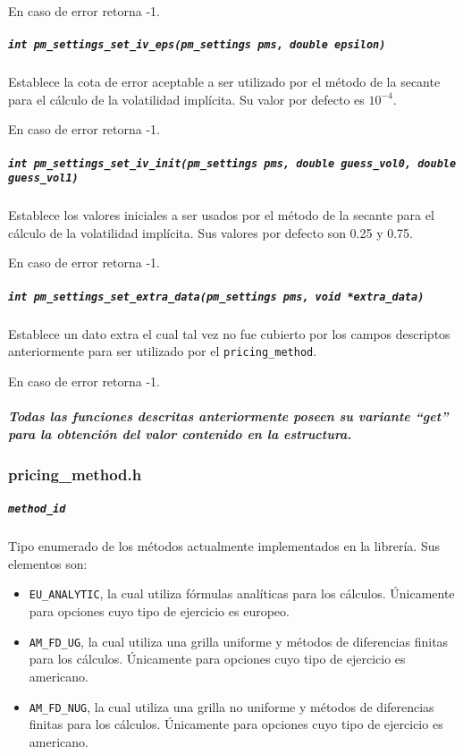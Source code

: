 \documentclass[12pt,a4paper,final]{article}
\begin{document}
				En caso de error retorna -1.

			\subparagraph{\texttt{int pm\_settings\_set\_iv\_eps(pm\_settings pms, double epsilon)}}
				Establece la cota de error aceptable a ser utilizado por el método de la secante
				para el cálculo de la volatilidad implícita. Su valor por defecto es $10^{-4}$.

				En caso de error retorna -1.

			\subparagraph{\texttt{int pm\_settings\_set\_iv\_init(pm\_settings pms, double guess\_vol0, double guess\_vol1)}}
				Establece los valores iniciales a ser usados por el método de la secante para el cálculo
				de la volatilidad implícita. Sus valores por defecto son 0.25 y 0.75.

				En caso de error retorna -1.

			\subparagraph{\texttt{int pm\_settings\_set\_extra\_data(pm\_settings pms, void *extra\_data)}}
				Establece un dato extra el cual tal vez no fue cubierto por los campos descriptos anteriormente
				para ser utilizado por el \texttt{pricing\_method}.

				En caso de error retorna -1.

			\subparagraph{Todas las funciones descritas anteriormente poseen su variante ``get''
				 para la obtención del valor contenido en la estructura.}

		\subsubsection{pricing\_method.h}

			\subparagraph{\texttt{method\_id}}
				Tipo enumerado de los métodos actualmente implementados en la librería.
				Sus elementos son:
				\begin{itemize}
					\item \texttt{EU\_ANALYTIC}, la cual utiliza fórmulas analíticas
						para los cálculos. Únicamente para opciones cuyo tipo de ejercicio es europeo.
					\item \texttt{AM\_FD\_UG}, la cual utiliza una grilla uniforme y métodos
						de diferencias finitas para los cálculos. Únicamente para opciones
						cuyo tipo de ejercicio es americano.
					\item \texttt{AM\_FD\_NUG}, la cual utiliza una grilla no uniforme y métodos
						de diferencias finitas para los cálculos. Únicamente para opciones
						cuyo tipo de ejercicio es americano.
				\end{itemize}
\end{document}
